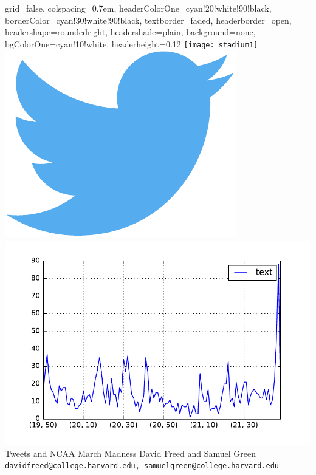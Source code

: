 \documentclass[landscape,a0paper,fontscale=0.292]{baposter}
\begin{document}
\begin{poster}{
 grid=false,
 colspacing=0.7em,
 headerColorOne=cyan!20!white!90!black,
 borderColor=cyan!30!white!90!black,
 textborder=faded,
 headerborder=open,
 headershape=roundedright,
 headershade=plain,
 background=none,
 bgColorOne=cyan!10!white,
 headerheight=0.12\textheight}
 {
      \texttt{[image: stadium1]}
      \includegraphics[width=0.10\linewidth]{twitter}
      \includegraphics[width=0.12\linewidth]{OregonHC_clean_timeseries.pdf}
 }
 {\sc\Huge Tweets and NCAA March Madness}
 {David Freed and Samuel Green\\[1em]
 {\texttt{davidfreed@college.harvard.edu, samuelgreen@college.harvard.edu}}}
 {
  \begin{tabular}{r}

\end{tabular}}
\end{poster}
\end{document}
